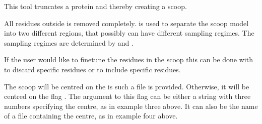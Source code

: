 \documentclass[letterpaper,10pt,english]{sphinxmanual}
\begin{document}

%
\begin{sphinxVerbatim}[commandchars=\\\{\}]
  
     
     
     
       
      
       
\end{sphinxVerbatim}


This tool truncates a protein and thereby creating a scoop.

All residues outside  is removed completely.  is used to separate the scoop model into two different regions, that possibly can have different sampling regimes. The sampling regimes are determined by  and .

If the user would like to finetune the residues in the scoop this can be done with  to discard specific residues or  to include specific residues.

The scoop will be centred on the  is such a file is provided. Otherwise, it will be centred on the flag . The argument to this flag can be either a string with three numbers specifying the centre, as in example three above. It can also be the name of a file containing the centre, as in example four above.
\end{document}
